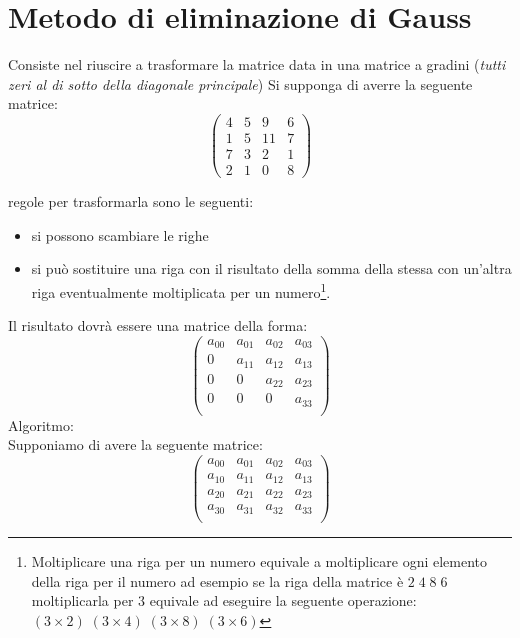 \documentclass[10pt,a4paper]{article}
\begin{document}
\pagebreak

\section{Metodo di eliminazione di Gauss}
Consiste nel riuscire a trasformare la matrice data  in una matrice a gradini (\textit{tutti zeri al di sotto della diagonale principale})
Si supponga di averre la seguente matrice:
\[\begin{pmatrix}
4 & 5 & 9 & 6\\
1 & 5 & 11 & 7\\
7 & 3 & 2 & 1\\
2 & 1 & 0 & 8
\end{pmatrix}\] 

regole per trasformarla sono le seguenti:
\begin{itemize}
	\item si possono scambiare le righe
	\item si può sostituire una riga con il risultato della somma della stessa con un'altra riga eventualmente moltiplicata per un numero\footnote{Moltiplicare una riga per un numero equivale a moltiplicare ogni elemento della riga per il numero ad esempio se la riga della matrice  è $ 2\; 4\; 8\; 6 $ moltiplicarla per $ 3 $ equivale ad eseguire la seguente operazione: $ (3\times 2)\;(3\times4)\;(3\times 8)\;(3\times 6) $}.
\end{itemize} 

Il risultato dovrà essere una matrice della forma:
\[\begin{pmatrix}
a_{0 0}&a_{0 1}&a_{0 2}&a_{0 3}\\
0&a_{1 1}&a_{1 2}&a_{1 3}\\
0&0&a_{2 2}&a_{2 3}\\
0&0&0&a_{3 3}\\
\end{pmatrix}\]
Algoritmo:\\
Supponiamo di avere la seguente matrice:
\[\begin{pmatrix}
a_{0 0}&a_{0 1}&a_{0 2}&a_{0 3}\\
a_{1 0}&a_{1 1}&a_{1 2}&a_{1 3}\\
a_{2 0}&a_{2 1}&a_{2 2}&a_{2 3}\\
a_{3 0}&a_{3 1}&a_{3 2}&a_{3 3}\\
\end{pmatrix}\]
\end{document}
